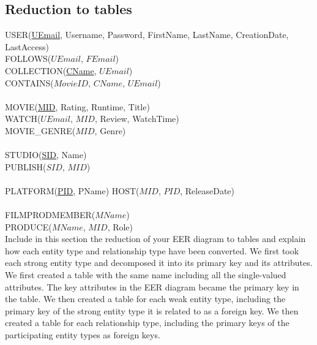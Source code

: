 \documentclass[12pt]{article}
\begin{document}
\subsection{Reduction to tables}

USER(\underline{UEmail}, Username, Password, FirstName, LastName, CreationDate, LastAccess)\\
FOLLOWS(\underline{$UEmail$}, $FEmail$)\\
COLLECTION(\underline{CName}, \underline{$UEmail$})\\
CONTAINS($MovieID$, $CName$, $UEmail$)\\
\\
MOVIE(\underline{MID}, Rating, Runtime, Title)\\
WATCH($UEmail$, $MID$, Review, WatchTime)\\
MOVIE\_GENRE($MID$, Genre)\\
\\
STUDIO(\underline{SID}, Name)\\
PUBLISH($SID$, $MID$)\\
\\
PLATFORM(\underline{PID}, PName)
HOST($MID$, $PID$, ReleaseDate)\\
\\
FILMPRODMEMBER(\underline{$MName$})\\
PRODUCE($MName$, $MID$, Role)\\



Include in this section the reduction of your EER diagram to tables and explain how each entity type and relationship type have been converted.
We first took each strong entity type and decomposed it into its primary key and its attributes. We first created a table with the same name including all the single-valued attributes. The key attributes in the EER diagram became the primary key in the table. We then created a table for each weak entity type, including the primary key of the strong entity type it is related to as a foreign key. We then created a table for each relationship type, including the primary keys of the participating entity types as foreign keys.
\end{document}
